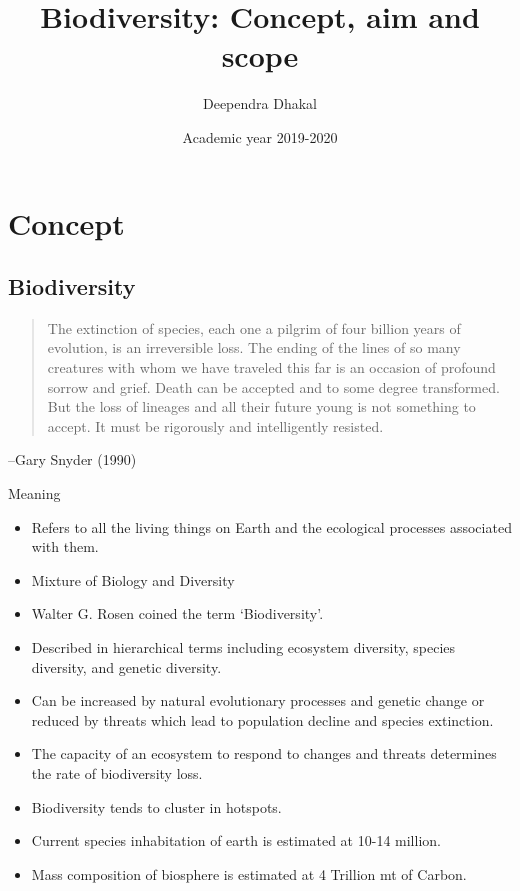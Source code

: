 \documentclass[ignorenonframetext,aspectratio=169]{beamer}
\title{Biodiversity: Concept, aim and scope}
\author{Deependra Dhakal}
\institute{GAASC, Baitadi \and Tribhuwan University}
\date{Academic year 2019-2020}
\providecommand{\tightlist}{%
  \setlength{\itemsep}{0pt}\setlength{\parskip}{0pt}}
\begin{document}
\frame{\titlepage}

\begin{frame}
\tableofcontents[hideallsubsections]
\end{frame}
\hypertarget{concept}{%
\section{Concept}\label{concept}}

\hypertarget{biodiversity}{%
\subsection{Biodiversity}\label{biodiversity}}

\begin{frame}{}
\protect\hypertarget{section}{}

\begin{quote}
The extinction of species, each one a pilgrim of four billion years of evolution, is an irreversible loss. The ending of the lines of so many creatures with whom we have traveled this far is an occasion of profound sorrow and grief. Death can be accepted and to some degree transformed. But the loss of lineages and all their future young is not something to accept. It must be rigorously and intelligently resisted.
\end{quote}
\begin{flushright} --Gary Snyder (1990) \end{flushright}

\end{frame}

\begin{frame}{Meaning}
\protect\hypertarget{meaning}{}

\begin{itemize}
\tightlist
\item
  Refers to all the living things on Earth and the ecological processes
  associated with them.
\item
  Mixture of \alert{Biology} and \alert{Diversity}
\item
  Walter G. Rosen coined the term `Biodiversity'.
\item
  Described in hierarchical terms including ecosystem diversity, species
  diversity, and genetic diversity.
\item
  Can be increased by natural evolutionary processes and genetic change
  or reduced by threats which lead to population decline and species
  extinction.
\item
  The capacity of an ecosystem to respond to changes and threats
  determines the rate of biodiversity loss.
\item
  Biodiversity tends to cluster in hotspots.
\item
  Current species inhabitation of earth is estimated at 10-14 million.
\item
  Mass composition of biosphere is estimated at 4 Trillion mt of Carbon.
\end{itemize}

\end{frame}
\end{document}
